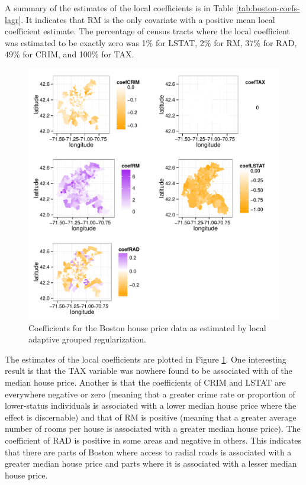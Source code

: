 \documentclass[authoryear,review, 12pt]{elsarticle}
\newcommand{\maxwidth}{\textwidth}
\begin{document}
A summary of the estimates of the local coefficients is in Table \ref{tab:boston-coefs-lagr}.
It indicates that RM is the only covariate with a positive mean local
coefficient estimate. The percentage of census tracts where the local
coefficient was estimated to be exactly zero was 1\%
for LSTAT, 2\%
for RM, 37\%
for RAD, 49\%
for CRIM, and 100\%
for TAX.

\begin{figure}

\includegraphics[width=\maxwidth]{figure/boston-plots} 


\caption{Coefficients for the Boston house price data as estimated by local adaptive grouped regularization.\label{fig:boston-lagr-coefs}}
\end{figure}

The estimates of the local coefficients are plotted in Figure \ref{fig:boston-lagr-coefs}.
One interesting result is that the TAX variable was nowhere found
to be associated with of the median house price. Another is that the
coefficients of CRIM and LSTAT are everywhere negative or zero (meaning
that a greater crime rate or proportion of lower-status individuals
is associated with a lower median house price where the effect is
discernable) and that of RM is positive (meaning that a greater average
number of rooms per house is associated with a greater median house
price). The coefficient of RAD is positive in some areas and negative
in others. This indicates that there are parts of Boston where access
to radial roads is associated with a greater median house price and
parts where it is associated with a lesser median house price.
\end{document}
